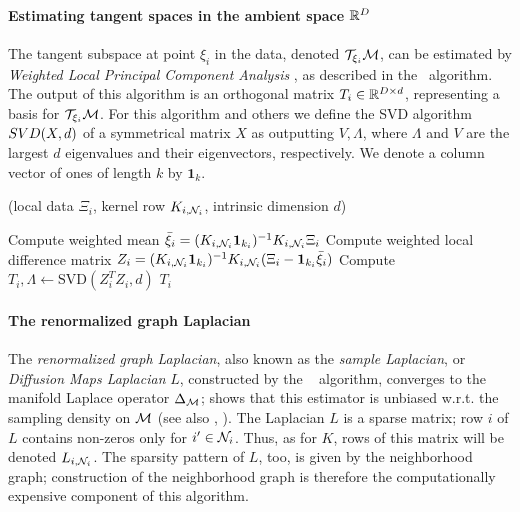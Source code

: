 \paragraph{Estimating tangent spaces in the ambient space ${\mathbb R}^D$}
The tangent subspace at point $\xi_i$ in the data, denoted ${\cal T}_{\xi_i}{\cal M}$, can be estimated by
{\em Weighted Local Principal Component Analysis} \citep{Chen2013}, as described in the
\tppalg~algorithm. The output of this algorithm is an orthogonal matrix
$T_i\in{\mathbb R}^{D\times d}$, representing a basis for ${\cal T}_{\xi_i}{\cal M}$. For
this algorithm and others we define the SVD algorithm
${\sc SVD}(X,d)$ of a symmetrical matrix $X$ as outputting
$V,\Lambda$, where $\Lambda$ and $V$ are the largest $d$ eigenvalues
and their eigenvectors, respectively. We denote a column vector of
ones of length $k$ by $ \bm{1}_k$. 
%
\begin{algorithm}[H]
 \renewcommand{\thealgorithm}{}
\caption{(local data $\Xi_i$,  kernel row $K_{i,{\cal N}_i}$, intrinsic dimension $d$)}
\begin{algorithmic}[1]
\STATE Compute weighted mean $\bar \xi_i = (K_{i,{\cal N}_i} \bm{1}_{k_i})^{-1} K_{i,{\cal N}_i} \Xi_i $
  \STATE Compute weighted local difference matrix $Z_{i} = (K_{i, {\cal N}_i}  \bm{1}_{k_i}) ^{-1} K_{i , {\cal N}_i} (\Xi_i - \bm{1}_{k_i} \bar \xi_i)$
  \STATE Compute $T_i, \Lambda \leftarrow \text{SVD} (Z_i^T Z_i, d)$
   $T_i$ 
\end{algorithmic}
\end{algorithm}


\paragraph{The renormalized graph Laplacian}
The {\em renormalized graph Laplacian}, also known as the {\em sample
  Laplacian}, or {\em Diffusion Maps Laplacian} $L$, constructed by the 
\lapalg~ algorithm, converges to the manifold Laplace operator
$\Delta_{\cal M}$; \citet{coifman:06} shows that this estimator is unbiased
w.r.t. the sampling density on ${\cal M}$ (see also \citet{HeinAL:05}, \citet{HeinAL:07,TingHJ:10}). The
Laplacian $L$ is a sparse matrix; row $i$ of $L$ contains non-zeros
only for $i'\in{\cal N}_i$. Thus, as for $K$, rows of this matrix will
be denoted $L_{i, {\cal N}_i}$. The sparsity pattern of $L$, too, is given by the
neighborhood graph; construction of the neighborhood graph is
therefore the computationally expensive component of this
algorithm. 


